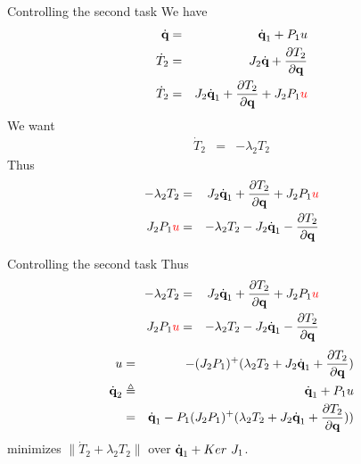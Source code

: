 %
%

\begin{frame} {Controlling the second task}
  We have
  \begin{eqnarray*}
    \dot{\textbf{q}} &=& \dot{\textbf{q}}_1 + P_1 u\\
    \dot{T}_2 &=& J_2\dot{\textbf{q}} + \frac{\partial T_2}{\partial \textbf{q}}\\
    \dot{T}_2 &=& J_2 \dot{\textbf{q}}_1 + \frac{\partial T_2}{\partial \textbf{q}} + J_2 P_1 {\color{red}u}
  \end{eqnarray*}
  \pause
  We want
  \begin{eqnarray*}
    \dot{T}_2 &=&  - \lambda_2 T_2
  \end{eqnarray*}
  \pause
  Thus
  \begin{eqnarray*}
    - \lambda_2 T_2 &=& J_2 \dot{\textbf{q}}_1 + \frac{\partial T_2}{\partial \textbf{q}} + J_2 P_1 {\color{red}u} \\
    J_2 P_1 {\color{red}u} &=& - \lambda_2 T_2 - J_2 \dot{\textbf{q}}_1 - \frac{\partial T_2}{\partial \textbf{q}}
  \end{eqnarray*}
\end{frame}

%
%

\begin{frame} {Controlling the second task}
  Thus
  \begin{eqnarray*}
    - \lambda_2 T_2 &=& J_2 \dot{\textbf{q}}_1 + \frac{\partial T_2}{\partial \textbf{q}} + J_2 P_1 {\color{red}u} \\
    J_2 P_1 {\color{red}u} &=& - \lambda_2 T_2 - J_2 \dot{\textbf{q}}_1 - \frac{\partial T_2}{\partial \textbf{q}}\\
  \end{eqnarray*}
  \pause
  \begin{eqnarray*}
    u &=& -(J_2P_1)^+(\lambda_2 T_2 + J_2 \dot{\textbf{q}}_1 + \frac{\partial T_2}{\partial \textbf{q}})\\
    \dot  {\textbf{q}}_2 &\triangleq& \dot{\textbf{q}}_1 + P_1 u\\
&=& \dot{\textbf{q}}_1 - P_1(J_2P_1)^+(\lambda_2 T_2 + J_2 \dot{\textbf{q}}_1 + \frac{\partial T_2}{\partial \textbf{q}})) \\
  \end{eqnarray*}
  minimizes $\|\dot{T}_2 + \lambda_2 T_2\|$ over $\dot{\textbf{q}}_1 + Ker\ J_1$.
\end{frame}

%
%

